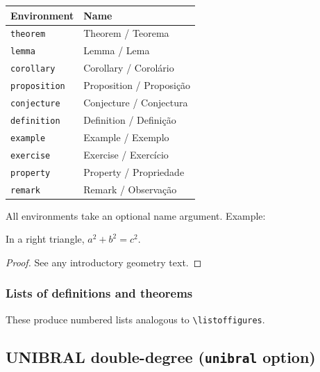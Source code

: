 \documentclass[11pt,a4paper]{article}
\newcommand{\opt}[1]{\texttt{#1}}
\newcommand{\cmd}[1]{\texttt{\textbackslash #1}}
\newcommand{\env}[1]{\texttt{#1}}
\begin{document}
\begin{center}
\begin{tabular}{@{}ll@{}}
  \toprule
  Environment & Name \\
  \midrule
  \env{theorem}      & Theorem / Teorema \\
  \env{lemma}        & Lemma / Lema \\
  \env{corollary}    & Corollary / Corolário \\
  \env{proposition}  & Proposition / Proposição \\
  \env{conjecture}   & Conjecture / Conjectura \\
  \env{definition}   & Definition / Definição \\
  \env{example}      & Example / Exemplo \\
  \env{exercise}     & Exercise / Exercício \\
  \env{property}     & Property / Propriedade \\
  \env{remark}       & Remark / Observação \\
  \bottomrule
\end{tabular}
\end{center}

All environments take an optional name argument.  Example:

\begin{latex}
\begin{theorem}
  In a right triangle, $a^2 + b^2 = c^2$.
\end{theorem}
\begin{proof}
  See any introductory geometry text.
\end{proof}
\end{latex}

\subsubsection{Lists of definitions and theorems}

\begin{latex}
\listofdefinitions
\listoftheorems
\end{latex}

These produce numbered lists analogous to \cmd{listoffigures}.

\subsection{UNIBRAL double-degree (\opt{unibral} option)}
\label{sec:unibral}
\end{document}
